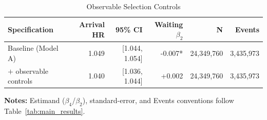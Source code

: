 \begin{table}[H]
\caption{Observable Selection Controls}
\label{tab:observable_controls}
\centering
\footnotesize
\begin{tabular}{@{}lrrrrr@{}}
\toprule
\textbf{Specification} & \textbf{Arrival HR} & \textbf{95\% CI} & \textbf{Waiting $\beta_2$} & \textbf{N} & \textbf{Events} \\
\midrule
Baseline (Model A) & 1.049 & [1.044, 1.054] & -0.007* & 24,349,760 & 3,435,973 \\
$+$ observable controls & 1.040 & [1.036, 1.044] & +0.002 & 24,349,760 & 3,435,973 \\
\bottomrule
\end{tabular}
\vspace{0.35em}
\begin{minipage}{\linewidth}
\footnotesize
\raggedright
\textbf{Notes:} Estimand ($\beta_4$/$\beta_2$), standard-error, and Events conventions follow Table~\ref{tab:main_results}.
\end{minipage}
\end{table}